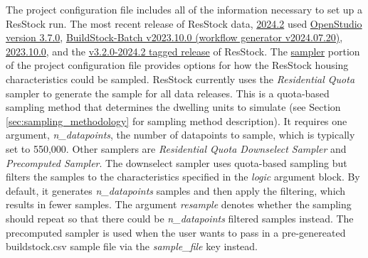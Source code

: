 The project configuration file includes all of the information necessary to set up a ResStock run. The most recent release of ResStock data, \href{https://resstock.nrel.gov/datasets}{2024.2} used 
\href{https://github.com/NREL/OpenStudio/releases/tag/v3.7.0}{OpenStudio version 3.7.0}, \href{https://github.com/NREL/buildstockbatch/tree/v2023.10.0}{BuildStock-Batch v2023.10.0 (workflow generator v2024.07.20)}, \href{https://buildstockbatch.readthedocs.io/en/v2023.10.0/index.html}{2023.10.0}, and the \href{https://github.com/NREL/resstock/tree/v3.2.0-2024.2}{v3.2.0-2024.2 tagged release} of ResStock. 
The \href{https://buildstockbatch.readthedocs.io/en/v2023.10.0/project_defn.html#sampler}{sampler} portion of the project configuration file provides options for how the ResStock housing characteristics could be sampled. ResStock currently uses the \textit{Residential Quota} sampler to generate the sample for all data releases. This is a quota-based sampling method that determines the dwelling units to simulate (see Section \ref{sec:sampling_methodology} for sampling method description). It requires one argument, \textit{n\_datapoints}, the number of datapoints to sample, which is typically set to 550,000. Other samplers are \textit{Residential Quota Downselect Sampler} and \textit{Precomputed Sampler}. The downselect sampler uses quota-based sampling but filters the samples to the characteristics specified in the \textit{logic} argument block. By default, it generates \textit{n\_datapoints} samples and then apply the filtering, which results in fewer samples. The argument \textit{resample} denotes whether the sampling should repeat so that there could be \textit{n\_datapoints} filtered samples instead. The precomputed sampler is used when the user wants to pass in a pre-genereated buildstock.csv sample file via the \textit{sample\_file} key instead.
